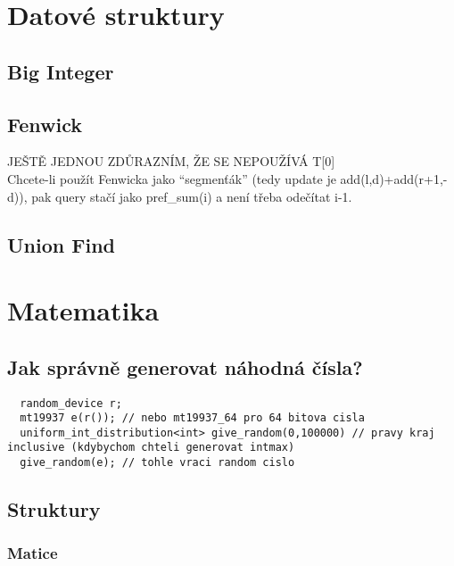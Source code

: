 \documentclass[10pt, a4paper]{article}
\begin{document}
\newpage

\section{Datové struktury}

\subsection{Big Integer}


\subsection{Fenwick}
JEŠTĚ JEDNOU ZDŮRAZNÍM, ŽE SE NEPOUŽÍVÁ T[0]\\
Chcete-li použít Fenwicka jako ``segmenťák'' (tedy update je add(l,d)+add(r+1,-d)), pak query stačí jako pref\_sum(i) a není třeba odečítat i-1.


\subsection{Union Find}


\newpage

\section{Matematika}

\subsection{Jak správně generovat náhodná čísla?}
\begin{lstlisting}
  random_device r;
  mt19937 e(r()); // nebo mt19937_64 pro 64 bitova cisla
  uniform_int_distribution<int> give_random(0,100000) // pravy kraj inclusive (kdybychom chteli generovat intmax)
  give_random(e); // tohle vraci random cislo
\end{lstlisting}

\subsection{Struktury}
\subsubsection{Matice}

\end{document}
